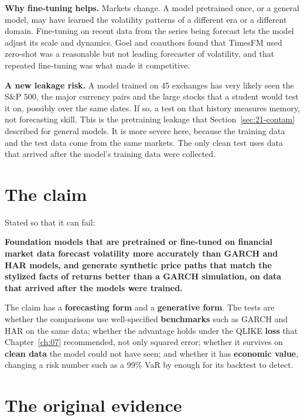 \textbf{Why fine-tuning helps.} Markets change. A model pretrained once, or a general model, may have learned the volatility patterns of a different era or a different domain. Fine-tuning on recent data from the series being forecast lets the model adjust its scale and dynamics. Goel and coauthors found that TimesFM used zero-shot was a reasonable but not leading forecaster of volatility, and that repeated fine-tuning was what made it competitive.

\textbf{A new leakage risk.} A model trained on 45 exchanges has very likely seen the S\&P 500, the major currency pairs and the large stocks that a student would test it on, possibly over the same dates. If so, a test on that history measures memory, not forecasting skill. This is the pretraining leakage that Section~\ref{sec:21-contam} described for general models. It is more severe here, because the training data and the test data come from the same markets. The only clean test uses data that arrived after the model's training data were collected.

\section{The claim}
\label{sec:23-claim}

Stated so that it can fail:

\begin{callout}
\textbf{Foundation models that are pretrained or fine-tuned on financial market data forecast volatility more accurately than GARCH and HAR models, and generate synthetic price paths that match the stylized facts of returns better than a GARCH simulation, on data that arrived after the models were trained.}
\end{callout}

The claim has a \textbf{forecasting form} and a \textbf{generative form}. The tests are whether the comparisons use well-specified \textbf{benchmarks} such as GARCH and HAR on the same data; whether the advantage holds under the QLIKE \textbf{loss} that Chapter~\ref{ch:07} recommended, not only squared error; whether it survives on \textbf{clean data} the model could not have seen; and whether it has \textbf{economic value}, changing a risk number such as a 99\% VaR by enough for its backtest to detect.

\section{The original evidence}
\label{sec:23-evidence}

